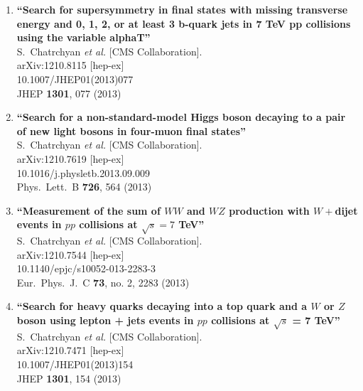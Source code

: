 \documentclass{article}
\begin{document}
\begin{enumerate}
\item%
{\bf ``Search for supersymmetry in final states with missing transverse energy and 0, 1, 2, or at least 3 b-quark jets in 7 TeV pp collisions using the variable alphaT''}
  \\{}S.~Chatrchyan {\it et al.}  [CMS Collaboration].
  \\{}arXiv:1210.8115 [hep-ex]
    \\{}10.1007/JHEP01(2013)077
\\{}JHEP {\bf 1301}, 077 (2013) %


\item%
{\bf ``Search for a non-standard-model Higgs boson decaying to a pair of new light bosons in four-muon final states''}
  \\{}S.~Chatrchyan {\it et al.}  [CMS Collaboration].
  \\{}arXiv:1210.7619 [hep-ex]
    \\{}10.1016/j.physletb.2013.09.009
\\{}Phys.\ Lett.\ B {\bf 726}, 564 (2013) %


\item%
{\bf ``Measurement of the sum of $W W$ and $WZ$ production with $W+$dijet events in $pp$ collisions at $\sqrt{s}=7$ TeV''}
  \\{}S.~Chatrchyan {\it et al.}  [CMS Collaboration].
  \\{}arXiv:1210.7544 [hep-ex]
    \\{}10.1140/epjc/s10052-013-2283-3
\\{}Eur.\ Phys.\ J.\ C {\bf 73}, no. 2, 2283 (2013) %


\item%
{\bf ``Search for heavy quarks decaying into a top quark and a $W$ or $Z$ boson using lepton + jets events in $pp$ collisions at $\sqrt{s}$ = 7 TeV''}
  \\{}S.~Chatrchyan {\it et al.}  [CMS Collaboration].
  \\{}arXiv:1210.7471 [hep-ex]
    \\{}10.1007/JHEP01(2013)154
\\{}JHEP {\bf 1301}, 154 (2013) %



\end{enumerate}
\end{document}
